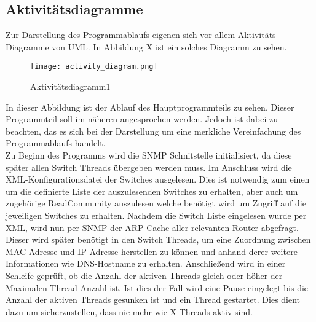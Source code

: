 \subsection{Aktivitätsdiagramme}
\label{subsec:acitvitydiagrams}

Zur Darstellung des Programmablaufs eigenen sich vor allem Aktivitäts-Diagramme von UML.
In Abbildung X ist ein solches Diagramm zu sehen.\\

\begin{figure}[H]
\centering
\texttt{[image: activity\_diagram.png]}
\caption{Aktivitätsdiagramm1}
\label{fig:activitydiagram1}
\end{figure}

In dieser Abbildung ist der Ablauf des Hauptprogrammteils zu sehen. Dieser Programmteil soll im näheren angesprochen werden. Jedoch ist dabei zu beachten, das es sich bei der Darstellung um eine merkliche Vereinfachung des Programmablaufs handelt.\\
Zu Beginn des Programms wird die SNMP Schnitstelle initialisiert, da diese später allen Switch Threads übergeben werden muss. Im Anschluss wird die XML-Konfigurationsdatei der Switches ausgelesen. Dies ist notwendig zum einen um die definierte Liste der auszulesenden Switches zu erhalten, aber auch um zugehörige ReadCommunity auszulesen welche benötigt wird um Zugriff auf die jeweiligen Switches zu erhalten. Nachdem die Switch Liste eingelesen wurde per XML, wird nun per SNMP der ARP-Cache aller relevanten Router abgefragt. Dieser wird später benötigt in den Switch Threads, um eine Zuordnung zwischen MAC-Adresse und IP-Adresse herstellen zu können und anhand derer weitere Informationen wie DNS-Hostname zu erhalten.
Anschließend wird in einer Schleife geprüft, ob die Anzahl der aktiven Threads gleich oder höher der Maximalen Thread Anzahl ist. Ist dies der Fall wird eine Pause eingelegt bis die Anzahl der aktiven Threads gesunken ist und ein Thread gestartet. Dies dient dazu um sicherzustellen, dass nie mehr wie X Threads aktiv sind.
